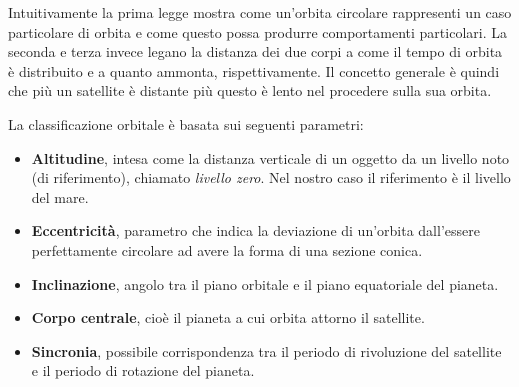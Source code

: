 \documentclass[12pt,a4paper,oneside]{book}
\begin{document}
			Intuitivamente la prima legge mostra come un'orbita circolare rappresenti un caso particolare di orbita e  come questo possa produrre comportamenti particolari. La seconda e terza invece legano la distanza dei due corpi a come il tempo di orbita è distribuito e a quanto ammonta, rispettivamente. Il concetto generale è quindi che più un satellite è distante più questo è lento nel procedere sulla sua orbita.
			
			La classificazione orbitale è basata sui seguenti parametri:
			\begin{itemize}
				\item \textbf{Altitudine}, intesa come la distanza verticale di un oggetto da un livello noto (di riferimento), chiamato \textit{livello zero}. Nel nostro caso il riferimento è il livello del mare.
				
				\item \textbf{Eccentricità}, parametro che indica la deviazione di un'orbita dall'essere perfettamente circolare ad avere la forma di una sezione conica. 
				
				\item \textbf{Inclinazione}, angolo tra il piano orbitale e il piano equatoriale del pianeta.
				
				\item \textbf{Corpo centrale}, cioè il pianeta a cui orbita attorno il satellite.
				
				\item \textbf{Sincronia}, possibile corrispondenza tra il periodo di rivoluzione del satellite e il periodo di rotazione del pianeta.
			\end{itemize}
\end{document}
